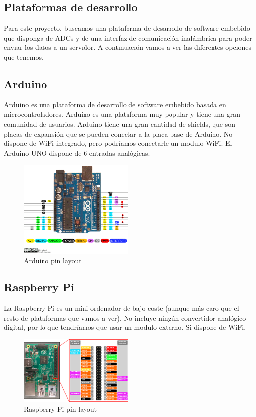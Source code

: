 \begin{titlepage}
\section{Plataformas de desarrollo}
Para este proyecto, buscamos una plataforma de desarrollo de software embebido que disponga de ADCs y de una interfaz de comunicación inalámbrica para poder enviar los datos a un servidor. A continuación vamos a ver las diferentes opciones que tenemos. \\
\subsection{Arduino}
Arduino\cite{ref8} es una plataforma de desarrollo de software embebido basada en microcontroladores. Arduino es una plataforma muy popular y tiene una gran comunidad de usuarios. Arduino tiene una gran cantidad de shields, que son placas de expansión que se pueden conectar a la placa base de Arduino. No dispone de WiFi integrado, pero podríamos conectarle un modulo WiFi. El Arduino UNO dispone de 6 entradas analógicas. \\
\begin{figure}[h!]
	\centering
	\includegraphics[width=0.5\textwidth]{imagenes/arduino.png}
	\caption{Arduino pin layout\cite{arduino_img}}
\end{figure}
\subsection{Raspberry Pi}
La Raspberry Pi\cite{ref9} es un mini ordenador de bajo coste (aunque más caro que el resto de plataformas que vamos a ver). No incluye ningún convertidor analógico digital, por lo que tendríamos que usar un modulo externo. Si dispone de WiFi.
\begin{figure}[h!] 
	\centering
	\includegraphics[width=0.5\textwidth]{imagenes/rpi.png}
	\caption{Raspberry Pi pin layout\cite{rpi_img}}
\end{figure}

\end{titlepage}
